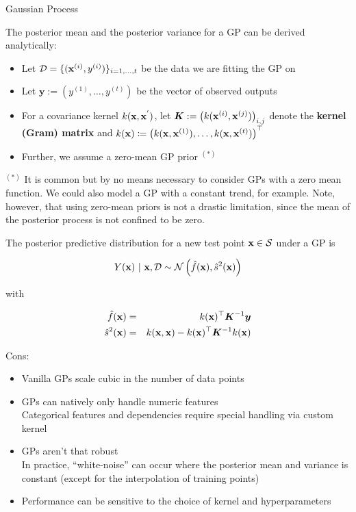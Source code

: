 \documentclass[11pt,compress,t,notes=noshow, xcolor=table]{beamer}
\begin{document}
\begin{vbframe}{Gaussian Process}
\framebreak

The posterior mean and the posterior variance for a GP can be derived analytically: 

\begin{itemize}
  \item Let $\mathcal{D} = \{(\mathbf{x}^{(i)}, y^{(i)})\}_{i = 1, \ldots, t}$ be the data we are fitting the GP on
  \item Let $\bm{y}:= \left(y^{(1)}, \ldots, y^{(t)}\right)$ be the vector of observed outputs
  \item For a covariance kernel $k(\mathbf{x}, \mathbf{x}^{'})$, let $\bm{K} := \left(k(\mathbf{x}^{(i)}, \mathbf{x}^{(j)})\right)_{i,j}$ denote the \textbf{kernel (Gram) matrix} and $k(\mathbf{x}) \coloneqq \left(k(\mathbf{x}, \mathbf{x}^{(1)}), \ldots, k(\mathbf{x}, \mathbf{x}^{(t)})\right)^\top$
  \item Further, we assume a zero-mean GP prior $^{(*)}$  
\end{itemize}

\vfill

\begin{footnotesize}
 $^{(*)}$ It is common but by no means necessary to consider GPs with a zero mean function. We could also model a GP with a constant trend, for example. Note, however, that using zero-mean priors is not a drastic limitation, since the mean of the posterior process is not confined to be zero. 
\end{footnotesize}

\framebreak 

The posterior predictive distribution for a new test point $\mathbf{x} \in \mathcal{S}$ under a GP is

\begin{eqnarray*}
  Y(\mathbf{x}) ~|~ \mathbf{x}, \mathcal{D} \sim \mathcal{N}\left(\hat{f}(\mathbf{x}), \hat{s}^2(\mathbf{x})\right)
\end{eqnarray*}

with 

\begin{eqnarray*}
  \hat{f}(\mathbf{x}) &=& k(\mathbf{x})^\top \bm{K}^{-1} \bm{y} \\
  \hat{s}^2(\mathbf{x}) &=& k(\mathbf{x}, \mathbf{x}) - k(\mathbf{x})^\top \bm{K}^{-1} k(\mathbf{x})
\end{eqnarray*}

\vfill

\framebreak

Cons:
\begin{itemize}
  \item Vanilla GPs scale cubic in the number of data points
  \item GPs can natively only handle numeric features\\
    Categorical features and dependencies require special handling via custom kernel
  \item GPs aren't that robust\\
    In practice, \enquote{white-noise} can occur where the posterior mean and variance is constant (except for the interpolation of training points)
  \item Performance can be sensitive to the choice of kernel and hyperparameters
\end{itemize}

\end{vbframe}
\end{document}
